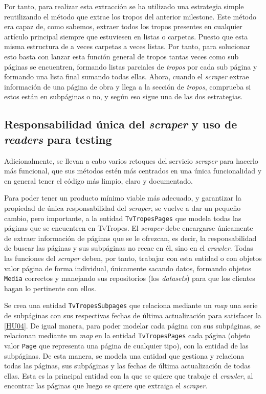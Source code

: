 Por tanto, para realizar esta extracción se ha utilizado una estrategia simple
reutilizando el método que extrae los tropos del anterior milestone. Este método
era capaz de, como sabemos, extraer todos los tropos presentes en cualquier
artículo principal siempre que estuviesen en listas o carpetas. Puesto que esta
misma estructura de a veces carpetas a veces listas. Por tanto, para solucionar
esto basta con lanzar esta función general de tropos tantas veces como sub
páginas se encuentren, formando listas parciales de \textit{tropos} por cada sub
página y formando una lista final sumando todas ellas. Ahora, cuando el
\textit{scraper} extrae información de una página de obra y llega a la sección
de \textit{tropos}, comprueba si estos están en subpáginas o no, y según eso
sigue una de las dos estrategias.

\subsection{Responsabilidad única del \textit{scraper} y uso de \textit{readers}
para testing} 

Adicionalmente, se llevan a cabo varios retoques del servicio \textit{scraper}
para hacerlo más funcional, que sus métodos estén más centrados en una única
funcionalidad y en general tener el código más limpio, claro y documentado.

Para poder tener un producto mínimo viable más adecuado, y garantizar la propiedad de
única responsabilidad del \textit{scraper}, se vuelve a dar un pequeño
cambio, pero importante, a la entidad \texttt{TvTropesPages} que modela todas las
páginas que se encuentren en TvTropes. El \textit{scraper} debe encargarse
únicamente de extraer información de páginas que se le ofrezcan, es decir, la
responsabilidad de buscar las páginas y sus subpáginas no recae en él, sino en
el \textit{crawler}. Todas las funciones del \textit{scraper} deben, por tanto,
trabajar con esta entidad o con objetos valor página de forma individual,
únicamente sacando datos, formando objetos \texttt{Media} correctos y manejando
sus repositorios (los \textit{datasets}) para que los clientes hagan lo
pertinente con ellos.

Se crea una entidad \texttt{TvTropesSubpages} que relaciona mediante un
\textit{map} una serie de subpáginas con sus respectivas fechas de última
actualización para satisfacer la
\href{https://github.com/jlgallego99/TropesToGo/issues/9}{[HU04]}. De igual
manera, para poder modelar cada página con sus subpáginas, se relacionan
mediante un \textit{map} en la entidad \texttt{TvTropesPages} cada página
(objeto valor \texttt{Page} que representa una página de cualquier tipo), con la
entidad de las subpáginas. De esta manera, se modela una entidad que
gestiona y relaciona todas las páginas, sus subpáginas y las fechas de última
actualización de todas ellas. Esta es la principal entidad con la que se quiere
que trabaje el \textit{crawler}, al encontrar las páginas que luego se quiere
que extraiga el \textit{scraper}.

